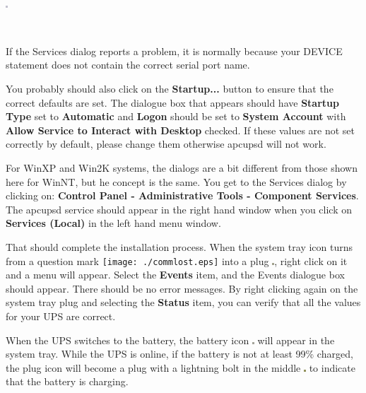 {{{{{{{\footnotesize
\begin{verbatim}
     
\end{verbatim}
\normalsize

\includegraphics{./wininstall6.eps}  

\footnotesize
\begin{verbatim}
     
\end{verbatim}
\normalsize

If the Services dialog reports a problem, it is normally because your DEVICE
statement does not contain the correct serial port name. 

You probably should also click on the {\bf Startup...} button to ensure that
the correct defaults are set. The dialogue box that appears should have {\bf
Startup Type} set to {\bf Automatic} and {\bf Logon} should be set to {\bf
System Account} with {\bf Allow Service to Interact with Desktop} checked. If
these values are not set correctly by default, please change them otherwise
apcupsd will not work.  

For WinXP and Win2K systems, the dialogs are a bit different from
those shown here for WinNT, but he concept is the same. You get to the
Services dialog by clicking on: {\bf Control Panel -\gt{} Administrative Tools
-\gt{} Component Services}. The apcupsd service should appear in the right
hand window when you click on {\bf Services (Local)} in the left hand menu
window.  

That should complete the installation process. When the system tray icon turns
from a question mark \texttt{[image: ./commlost.eps]} into a plug
\includegraphics{./online.eps}, right click on it and a menu will appear.
Select the {\bf Events} item, and the Events dialogue box should appear. There
should be no error messages. By right clicking again on the system tray plug
and selecting the {\bf Status} item, you can verify that all the values for
your UPS are correct.  

When the UPS switches to the battery, the battery icon 
\includegraphics{./onbatt.eps} will appear in the system tray. While the 
UPS is online, if the battery is not at least 99\% charged, the plug icon 
will become a plug with a lightning bolt in the middle 
\includegraphics{./charging.eps} to indicate that the battery is charging. 

}}}}}}}
